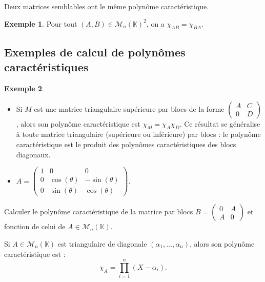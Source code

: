 \documentclass[french]{article}
\newcommand{\K}{\mathbb{K}}
\theoremstyle{plain}
\theoremstyle{definition}
\newtheorem*{ex}{Exemple}
\theoremstyle{remark}
\begin{document}
	\begin{prop}%
		Deux matrices semblables ont le même polynôme caractéristique.
	\end{prop}
	
	\begin{ex}
		Pour tout $(A,B)\in\mathcal{M}_n(\K)^2$, on a $\chi_{AB}=\chi_{BA}$.
	\end{ex}
	
	\subsection{Exemples de calcul de polynômes caractéristiques}
	
	\begin{ex}
		\begin{itemize}
			\item Si $M$ est une matrice triangulaire supérieure par blocs de la forme $\displaystyle\begin{pmatrix}
				A&C\\
				0&D
			\end{pmatrix}$, alors son polynôme caractéristique est $\chi_M=\chi_A\chi_D$. Ce résultat se généralise à toute matrice triangulaire (supérieure ou inférieure) par blocs : le polynôme caractéristique est le produit des polynômes caractéristiques des blocs diagonaux.
			\item $A=\displaystyle\begin{pmatrix}
				1&0&0\\
				0&\cos(\theta)&-\sin(\theta)\\
				0&\sin(\theta)&\cos(\theta)
			\end{pmatrix}$.
		\end{itemize}
	\end{ex}
	
	\begin{exo}
		Calculer le polynôme caractéristique de la matrice par blocs $B=\displaystyle\begin{pmatrix}
			0&A\\
			A&0
		\end{pmatrix}$ et fonction de celui de $A\in\mathcal{M}_n(\K)$.
	\end{exo}
	
	\begin{prop}%
		Si $A\in\mathcal{M}_n(\K)$ est triangulaire de diagonale $(\alpha_1,\ldots,\alpha_n)$, alors son polynôme caractéristique est : $$\chi_A=\prod_{i=1}^{n}(X-\alpha_i).$$
	\end{prop}
	
\end{document}
